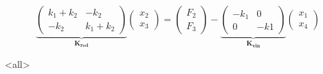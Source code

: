 \begin{equation}
  \underbrace{
  \begin{pmatrix} k_1 + k_2 & - k_2 \\ -k_2 & k_1 + k_2 \end{pmatrix}
  }_{ \mathbf{K_{red} } }
  \begin{pmatrix}x_2 \\ x_3\end{pmatrix}
  = 
  \begin{pmatrix}F_2 \\ F_3\end{pmatrix}
  -
  \underbrace{
  \begin{pmatrix} -k_1 & 0 \\ 0 & -k1 \end{pmatrix}
  }_{ \mathbf{ K_{vin} } }
  \begin{pmatrix}x_1 \\ x_4\end{pmatrix}
\end{equation}


\mode*

\mode<all>
